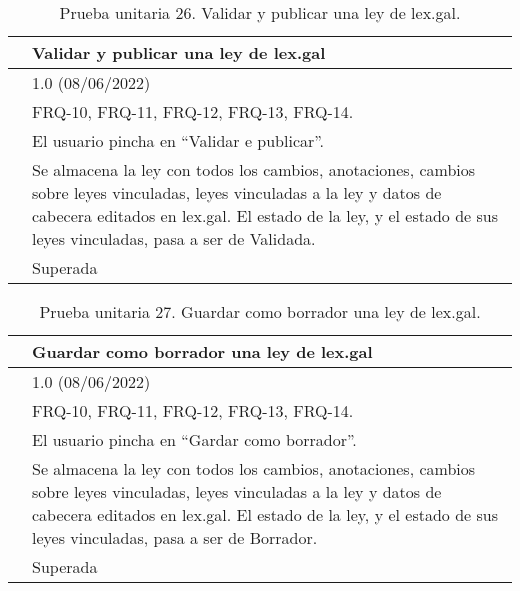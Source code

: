 \begin{table}[H]
\begin{center}
\begin{tabular}{|p{3cm}|p{10cm}|} \hline
\centering {\bf PU-26} & Validar y publicar una ley de lex.gal  \\ \hline\hline
\centering {\bf Versión} & 1.0 (08/06/2022) \\ \hline
\centering {\bf Dependencias} & FRQ-10, FRQ-11, FRQ-12, FRQ-13, FRQ-14. \\ \hline
\centering {\bf Descripción} &  El usuario pincha en ``Validar e publicar''. \\ \hline
\centering {\bf Criterio de aceptación} & Se almacena la ley con todos los cambios, anotaciones, cambios sobre leyes vinculadas, leyes vinculadas a la ley y datos de cabecera editados en lex.gal. El estado de la ley, y el estado de sus leyes vinculadas, pasa a ser de Validada. \\ \hline
\centering {\bf Estado} & Superada \\ \hline
\end{tabular}
\caption{Prueba unitaria 26. Validar y publicar una ley de lex.gal.}
\label{enlacePU26}
\end{center}
\end{table}

\begin{table}[H]
\begin{center}
\begin{tabular}{|p{3cm}|p{10cm}|} \hline
\centering {\bf PU-27} & Guardar como borrador una ley de lex.gal  \\ \hline\hline
\centering {\bf Versión} & 1.0 (08/06/2022) \\ \hline
\centering {\bf Dependencias} & FRQ-10, FRQ-11, FRQ-12, FRQ-13, FRQ-14. \\ \hline
\centering {\bf Descripción} &  El usuario pincha en ``Gardar como borrador''. \\ \hline
\centering {\bf Criterio de aceptación} & Se almacena la ley con todos los cambios, anotaciones, cambios sobre leyes vinculadas, leyes vinculadas a la ley y datos de cabecera editados en lex.gal. El estado de la ley, y el estado de sus leyes vinculadas, pasa a ser de Borrador. \\ \hline
\centering {\bf Estado} & Superada \\ \hline
\end{tabular}
\caption{Prueba unitaria 27. Guardar como borrador una ley de lex.gal.}
\label{enlacePU27}
\end{center}
\end{table}


